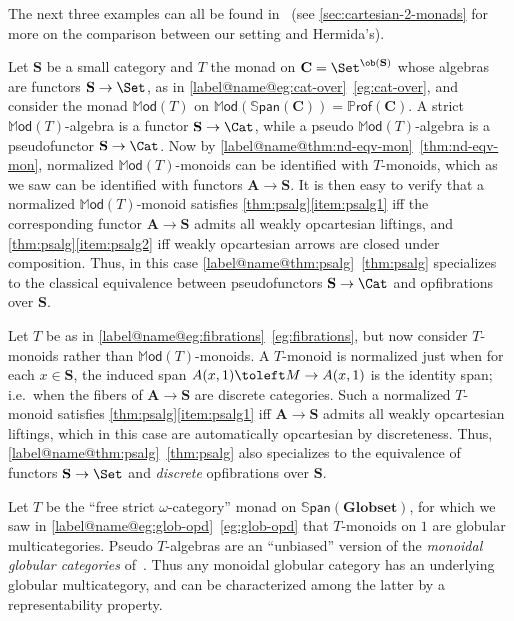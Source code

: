 \documentclass{tac}
\makeatletter
\newcommand{\C}{\ensuremath{\mathbf{C}}}
\newcommand{\mb}[1]{{\mathbf{#1}}}
\newcommand{\SPAN}[1]{\mathbb{S}\mathsf{pan}\!\left(\mb{#1}\right)}
\newcommand{\iPROF}[1]{\mathbb{P}\mathsf{rof}(\mb{#1})}
\newcommand{\Mod}{\ensuremath{\mathbb{M}\mathsf{od}}}
\numberwithin{equation}{section}
\def\currthmtype{}
\def\autoref#1{\ref*{label@name@#1}~\ref{#1}}
\def\autoref#1{\ref{label@name@#1}~\ref{#1}}
\let\old@label\label
\def\label#1{%
    {\let\your@currentlabel\@currentlabel%
      \edef\@currentlabel{\currthmtype}%
      \old@label{label@name@#1}}%
    \old@label{#1}}
\makeatother
\begin{document}
The next three examples can all be found in~\cite{HermidaCoherent} (see
\ref{sec:cartesian-2-monads} for more on the comparison between our
setting and Hermida's).

\begin{example}\label{eg:fibrations}
  Let $\mb{S}$ be a small category and $T$ the monad on
  $\C=\Set^{\ob(\mb{S})}$ whose algebras are functors $\mb{S}\to
  \Set$, as in \autoref{eg:cat-over}, and consider the monad
  $\Mod(T)$ on $\Mod(\SPAN{C}) = \iPROF{C}$.  A strict
  $\Mod(T)$-algebra is a functor $\mb{S}\to\Cat$, while a pseudo
  $\Mod(T)$-algebra is a pseudofunctor $\mb{S}\to\Cat$.  Now by
  \autoref{thm:nd-eqv-mon}, normalized $\Mod(T)$-monoids can be
  identified with $T$-monoids, which as we saw can be identified with
  functors $\mb{A}\to\mb{S}$.  It is then easy to verify that a
  normalized $\Mod(T)$-monoid satisfies
  \ref{thm:psalg}\ref{item:psalg1} iff the corresponding functor
  $\mb{A}\to\mb{S}$ admits all weakly opcartesian liftings, and
  \ref{thm:psalg}\ref{item:psalg2} iff weakly opcartesian arrows are closed
  under composition.  Thus, in this case \autoref{thm:psalg}
  specializes to the classical equivalence between pseudofunctors
  $\mb{S}\to\Cat$ and opfibrations over $\mb{S}$.
\end{example}

\begin{example}\label{thm:discfib}
  Let $T$ be as in \autoref{eg:fibrations}, but now consider
  $T$-monoids rather than $\Mod(T)$-monoids.  A $T$-monoid is
  normalized just when for each $x\in \mb{S}$, the induced span $A(x,1)
  \toleft M \to A(x,1)$ is the identity span; i.e.\ when the fibers of
  $\mb{A}\to\mb{S}$ are discrete categories.  Such a normalized
  $T$-monoid satisfies \ref{thm:psalg}\ref{item:psalg1} iff
  $\mb{A}\to\mb{S}$ admits all weakly opcartesian liftings, which in this
  case are automatically opcartesian by discreteness.  Thus,
  \autoref{thm:psalg} also specializes to the equivalence of functors
  $\mb{S}\to\Set$ and \emph{discrete} opfibrations over $\mb{S}$.
\end{example}

\begin{example}
  Let $T$ be the ``free strict $\omega$-category'' monad on
  $\SPAN{Globset}$, for which we saw in \autoref{eg:glob-opd} that
  $T$-monoids on $1$ are globular multicategories.  Pseudo $T$-algebras are
  an ``unbiased'' version of the \emph{monoidal
    globular categories} of~\cite{batanin:monglob}.  Thus any monoidal
  globular category has an underlying globular multicategory, and can
  be characterized among the latter by a representability property.
\end{example}
\end{document}
